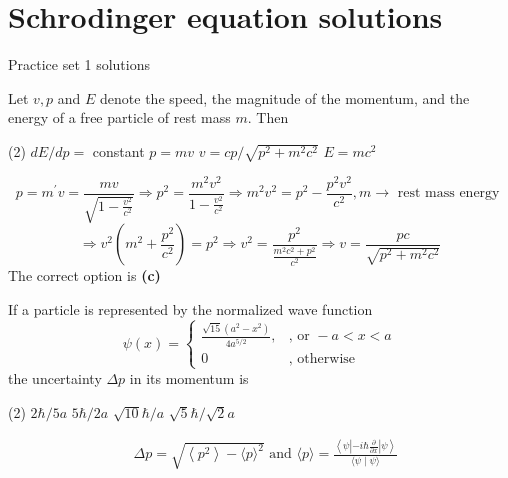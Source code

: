 \chapter{Schrodinger equation solutions}
\begin{abox}
	Practice set 1 solutions
	\end{abox}
\begin{enumerate}
\begin{minipage}{\textwidth}
	\item Let $v, p$ and $E$ denote the speed, the magnitude of the momentum, and the energy of a free particle of rest mass $m$. Then
\end{minipage}
\begin{tasks}(2)
	\task[\textbf{A.}] $d E / d p=$ constant
	\task[\textbf{B.}]$p=m v$
	\task[\textbf{C.}]$v=c p / \sqrt{p^{2}+m^{2} c^{2}}$
	\task[\textbf{D.}] $E=m c^{2}$
\end{tasks}
\begin{answer}
	$$p=m^{\prime} v=\frac{m v}{\sqrt{1-\frac{v^{2}}{c^{2}}}} \Rightarrow p^{2}=\frac{m^{2} v^{2}}{1-\frac{v^{2}}{c^{2}}} \Rightarrow m^{2} v^{2}=p^{2}-\frac{p^{2} v^{2}}{c^{2}}, m \rightarrow \text { rest mass energy }$$
	$$\Rightarrow v^{2}\left(m^{2}+\frac{p^{2}}{c^{2}}\right)=p^{2} \Rightarrow v^{2}=\frac{p^{2}}{\frac{m^{2} c^{2}+p^{2}}{c^{2}}} \Rightarrow v=\frac{p c}{\sqrt{p^{2}+m^{2} c^{2}}}$$
	The correct option is \textbf{(c)}
\end{answer}
\begin{minipage}{\textwidth}
\item If a particle is represented by the normalized wave function
$$
\psi(x)= \begin{cases}\frac{\sqrt{15}\left(a^{2}-x^{2}\right)}{4 a^{5 / 2}}, & \text {, or }-a<x<a \\ 0 & , \text { otherwise }\end{cases}
$$
the uncertainty $\Delta p$ in its momentum is
\end{minipage}
\begin{tasks}(2)
	\task[\textbf{A.}] $2 \hbar / 5 a$
	\task[\textbf{B.}] $5 \hbar / 2 a$
	\task[\textbf{C.}]$\sqrt{10} \hbar / a$
	\task[\textbf{D.}]$\sqrt{5} \hbar / \sqrt{2} a$
\end{tasks}
\begin{answer}
	\begin{align*}
	&\Delta p=\sqrt{\left\langle p^{2}\right\rangle-\langle p\rangle^{2}} \text { and }\langle p\rangle=\frac{\left\langle\psi\left|-i \hbar \frac{\partial}{\partial x}\right| \psi\right\rangle}{\langle\psi \mid \psi\rangle}\\

\end{align*}
\end{answer}
\end{enumerate}
